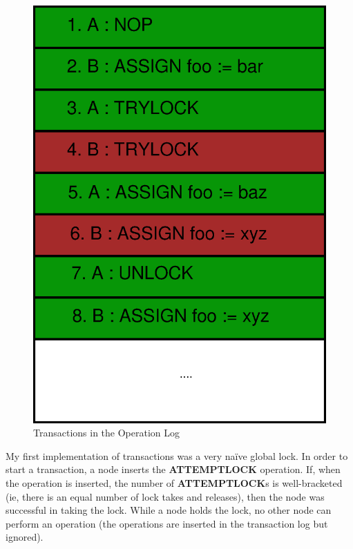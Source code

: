 \documentclass[12pt,twoside,notitlepage]{report}
\newcommand{\op}[1]  {{\bf #1}}         %
\begin{document}
\begin{figure}[htb]
\centering
\includegraphics[scale=0.5]{figs/op-log-trylock.eps}
\caption{\label{fig:op-log-trylock}Transactions in the Operation Log}
\end{figure}


My first implementation of transactions was a very na\"ive global lock. In order to start a
transaction, a node inserts the \op{ATTEMPTLOCK} operation. If, when the operation is inserted, the
number of \op{ATTEMPTLOCK}s is well-bracketed (ie, there is an equal number of lock takes and
releases), then the node was successful in taking the lock. While a node holds the lock, no other
node can perform an operation (the operations are inserted in the transaction log but ignored).
\end{document}
